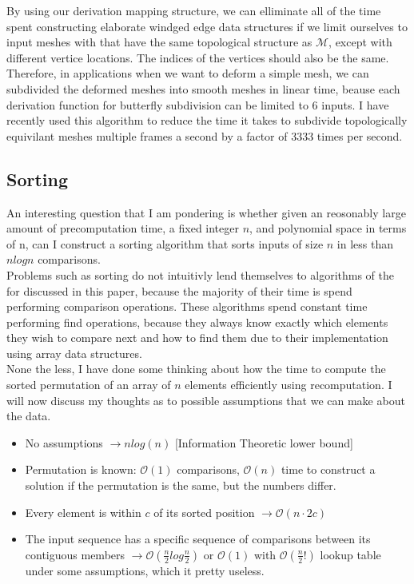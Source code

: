 \documentclass[11pt]{article} %
\newcommand{\bigO}{\mathcal{O}}
\begin{document}
By using our derivation mapping structure, we can elliminate all of the time spent constructing elaborate windged edge data structures if we limit ourselves to input meshes with that have the same topological structure as $\mathcal{M}$, except with different vertice locations. The indices of the vertices should also be the same. Therefore, in applications when we want to deform a simple mesh, we can subdivided the deformed meshes into smooth meshes in linear time, beause each derivation function for butterfly subdivision can be limited to 6 inputs. I have recently used this algorithm to reduce the time it takes to subdivide topologically equivilant meshes multiple frames a second by a factor of 3333 times per second.

\subsection{Sorting}

An interesting question that I am pondering is whether given an reosonably large amount of precomputation time, a fixed integer $n$, and polynomial space in terms of n, can I construct a sorting algorithm that sorts inputs of size $n$ in less than $n log n$ comparisons.\\

Problems such as sorting do not intuitivly lend themselves to algorithms of the for discussed in this paper, because the majority of their time is spend performing comparison operations. These algorithms spend constant time performing find operations, because they always know exactly which elements they wish to compare next and how to find them due to their implementation using array data structures.\\

None the less, I have done some thinking about how the time to compute the sorted permutation of an array of $n$ elements efficiently using recomputation. I will now discuss my thoughts as to possible assumptions that we can make about the data.

\begin{itemize}
\item No assumptions $\rightarrow nlog(n)$ [Information Theoretic lower bound]
\item Permutation is known: $\bigO(1)$ comparisons, $\bigO(n)$ time to construct a solution if the permutation is the same, but the numbers differ.
\item Every element is within $c$ of its sorted position $\rightarrow \bigO(n \cdot 2c)$
\item The input sequence has a specific sequence of comparisons between its contiguous members $\rightarrow \bigO(\frac{n}{2}log\frac{n}{2})$ or $\bigO(1)$ with $\bigO(\frac{n}{2}!)$ lookup table under some assumptions, which it pretty useless.
\end{itemize}
\end{document}
